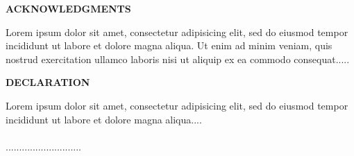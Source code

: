 \newpage
\thispagestyle{plain}
\vspace*{15cm} 
\begin{large}
\noindent
\textbf{ACKNOWLEDGMENTS} \\
\end{large}
\noindent
Lorem ipsum dolor sit amet, consectetur adipisicing elit, sed do eiusmod tempor incididunt ut labore et dolore magna aliqua. Ut enim ad minim veniam, quis nostrud exercitation ullamco laboris nisi ut aliquip ex ea commodo consequat.....
\newpage
\thispagestyle{plain}
\vspace*{15cm} 
\begin{large}
\noindent
\textbf{DECLARATION} \\
\end{large}
\noindent
Lorem ipsum dolor sit amet, consectetur adipisicing elit, sed do eiusmod tempor incididunt ut labore et dolore magna aliqua....\\
\vspace*{0.5cm}\\
\hspace*{10cm}............................\\
\hspace*{10.7cm} \Author